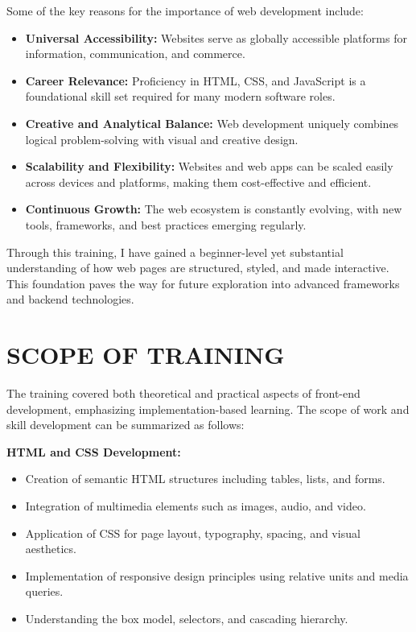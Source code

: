 \documentclass[a4paper,12pt,oneside]{report}
\numberwithin{equation}{chapter}
\numberwithin{figure}{chapter}
\numberwithin{table}{chapter}
\begin{document}
Some of the key reasons for the importance of web development include:

\begin{itemize}
    \item \textbf{Universal Accessibility:} Websites serve as globally accessible platforms for information, communication, and commerce.
    \item \textbf{Career Relevance:} Proficiency in HTML, CSS, and JavaScript is a foundational skill set required for many modern software roles.
    \item \textbf{Creative and Analytical Balance:} Web development uniquely combines logical problem-solving with visual and creative design.
    \item \textbf{Scalability and Flexibility:} Websites and web apps can be scaled easily across devices and platforms, making them cost-effective and efficient.
    \item \textbf{Continuous Growth:} The web ecosystem is constantly evolving, with new tools, frameworks, and best practices emerging regularly.
\end{itemize}

Through this training, I have gained a beginner-level yet substantial understanding of how web pages are structured, styled, and made interactive. This foundation paves the way for future exploration into advanced frameworks and backend technologies.

\section{SCOPE OF TRAINING}

The training covered both theoretical and practical aspects of front-end development, emphasizing implementation-based learning. The scope of work and skill development can be summarized as follows:

\textbf{HTML and CSS Development:}
\begin{itemize}
    \item Creation of semantic HTML structures including tables, lists, and forms.
    \item Integration of multimedia elements such as images, audio, and video.
    \item Application of CSS for page layout, typography, spacing, and visual aesthetics.
    \item Implementation of responsive design principles using relative units and media queries.
    \item Understanding the box model, selectors, and cascading hierarchy.
\end{itemize}
\end{document}

